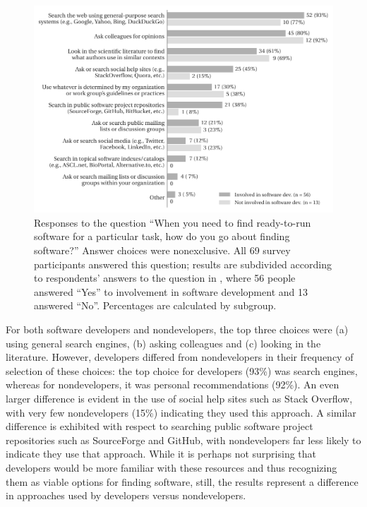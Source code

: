 \documentclass{casicswhitepaper}
\newcommand{\totalRespondents}{69\xspace}
\newcommand{\totalDevelopers}{56\xspace}
\begin{document}
\begin{figure}[htb]
  \vspace*{-1ex}
  \centering
  \includegraphics{files/plots/how-find-ready-to-run-v4.pdf}
  \vspace*{-4ex}
  \caption{Responses to the question ``When you need to find ready-to-run software for a particular task, how do you go about finding software?'' Answer choices were nonexclusive.  All \totalRespondents survey participants answered this question; results are subdivided according to respondents' answers to the question in , where \totalDevelopers people answered ``Yes'' to involvement in software development and 13 answered ``No''.  Percentages are calculated by subgroup.}
  \label{how-find-ready-to-run}
\end{figure}

For both software developers and nondevelopers, the top three choices were (a) using general search engines, (b) asking colleagues and (c) looking in the literature.  However, developers differed from nondevelopers in their frequency of selection of these choices: the top choice for developers (93\%) was search engines, whereas for nondevelopers, it was personal recommendations (92\%).  An even larger difference is evident in the use of social help sites such as Stack Overflow, with very few nondevelopers (15\%) indicating they used this approach.  A similar difference is exhibited with respect to searching public software project repositories such as SourceForge and GitHub, with nondevelopers far less likely to indicate they use that approach.  While it is perhaps not surprising that developers would be more familiar with these resources and thus recognizing them as viable options for finding software, still, the results represent a difference in approaches used by developers versus nondevelopers.
\end{document}
